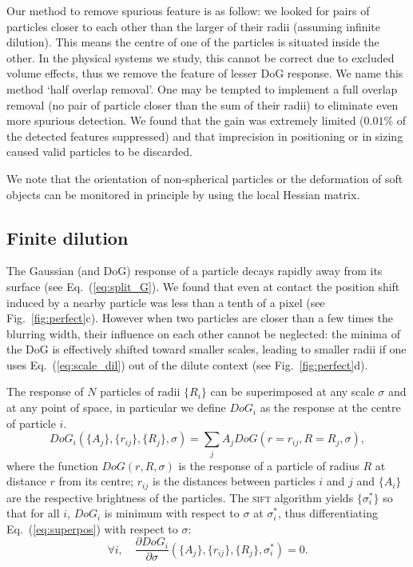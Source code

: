 \documentclass[8.5pt,twoside,twocolumn]{article}
\begin{document}
Our method to remove spurious feature is as follow: we looked for pairs of particles closer to each other than the larger of their radii (assuming infinite dilution). This means the centre of one of the particles is situated inside the other. In the physical systems we study, this cannot be correct due to excluded volume effects, thus we remove the feature of lesser DoG response. We name this method `half overlap removal'. One may be tempted to implement a full overlap removal (no pair of particle closer than the sum of their radii) to eliminate even more spurious detection. We found that the gain was extremely limited ($0.01\%$ of the detected features suppressed) and that imprecision in positioning or in sizing caused valid particles to be discarded.

We note that the orientation of non-spherical particles or the deformation of soft objects can be monitored in principle by using the local Hessian matrix.

\subsection{Finite dilution}
The Gaussian (and DoG) response of a particle decays rapidly away from its surface (see Eq.~(\ref{eq:split_G}). We found that even at contact the position shift induced by a nearby particle was less than a tenth of a pixel (see Fig.~\ref{fig:perfect}c). However when two particles are closer than a few times the blurring width, their influence on each other cannot be neglected: the minima of the DoG is effectively shifted toward smaller scales, leading to smaller radii if one uses Eq.~(\ref{eq:scale_dil}) out of the dilute context (see Fig.~\ref{fig:perfect}d).

The response of $N$ particles of radii $\lbrace R_i\rbrace$ can be superimposed at any scale $\sigma$ and at any point of space, in particular we define $DoG_i$ as the response at the centre of particle $i$.
\begin{equation}
DoG_i(\lbrace A_j\rbrace, \lbrace r_{ij}\rbrace, \lbrace R_j\rbrace, \sigma) = \sum_j A_j DoG(r=r_{ij}, R=R_j, \sigma),
\label{eq:superpos}
\end{equation}
where the function $DoG(r,R,\sigma)$ is the response of a particle of radius $R$ at distance $r$ from its centre; $r_{ij}$ is the distances between particles $i$ and $j$ and $\lbrace A_i\rbrace$ are the respective brightness of the particles. The \textsc{sift} algorithm yields $\lbrace \sigma_i^*\rbrace$ so that for all $i$, $DoG_i$ is minimum with respect to $\sigma$ at $\sigma_i^*$, thus differentiating Eq.~(\ref{eq:superpos}) with respect to $\sigma$:
\begin{equation}
\forall i,\quad \frac{\partial DoG_i}{\partial\sigma}(\lbrace A_j\rbrace, \lbrace r_{ij}\rbrace, \lbrace R_j\rbrace, \sigma_i^*) = 0.
\label{eq:DoG_min}
\end{equation}
\end{document}
